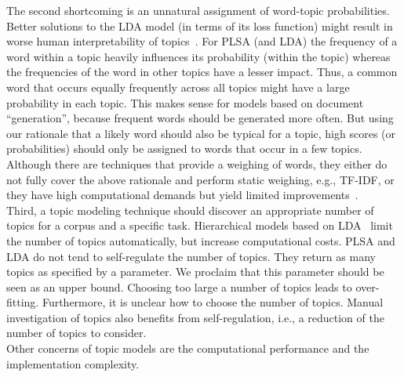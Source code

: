 \documentclass[twocolumn,10]{article}
\newcommand{\ci}{~\cite} \newcommand{\re}{~\ref} \newcommand{\ma}{\mathbb}
\begin{document}
	
	The second shortcoming is an unnatural assignment of word-topic probabilities. Better solutions to the LDA model (in terms of its loss function) might result in worse human interpretability of topics\ci{cha09}. For PLSA (and LDA) the frequency of a word within a topic heavily influences its probability (within the topic) whereas the frequencies of the word in other topics have a lesser impact. Thus, a common word that occurs equally frequently across all topics might have a large probability in each topic. This makes sense for models based on document ``generation'', because frequent words should be generated more often. But using our rationale that a likely word should also be typical for a topic, high scores (or probabilities) should only be assigned to words that occur in a few topics. Although there are techniques that provide a weighing of words, they either do not fully cover the above rationale and perform static weighing, e.g., TF-IDF, or they have high computational demands but yield limited improvements\ci{lee15}.\\	
	Third, a topic modeling technique should discover an appropriate number of topics for a corpus and a specific task. Hierarchical models based on LDA\ci{teh05,mim07} limit the number of topics automatically, but increase computational costs. PLSA and LDA do not tend to self-regulate the number of topics. They return as many topics as specified by a parameter. We proclaim that this parameter should be seen as an upper bound. Choosing too large a number of topics leads to over-fitting. Furthermore, it is unclear how to choose the number of topics. Manual investigation of topics also benefits from self-regulation, i.e., a reduction of the number of topics to consider.
	\\ Other concerns of topic models are the computational performance and the implementation complexity. 	
\end{document}
